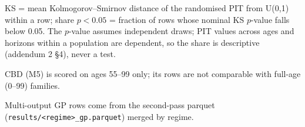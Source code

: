 {\begin{minipage}{\linewidth}
\noindent KS = mean Kolmogorov--Smirnov distance of the randomised PIT from U(0,1) within a row; share $p<0.05$ = fraction of rows whose nominal KS $p$-value falls below 0.05. The $p$-value assumes independent draws; PIT values across ages and horizons within a population are dependent, so the share is descriptive (addendum 2 \S4), never a test.\par
\noindent CBD (M5) is scored on ages 55--99 only; its rows are not comparable with full-age (0--99) families.\par
\noindent Multi-output GP rows come from the second-pass parquet (\texttt{results/<regime>\_gp.parquet}) merged by regime.\par
\end{minipage}}
